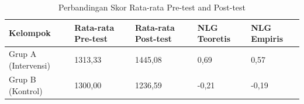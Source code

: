 \begin{table}[!ht]
    \centering
    \caption{Perbandingan Skor Rata-rata Pre-test and Post-test}
    \label{tbl:perbandingan_skor}
    \begin{tabular}{|p{3.5cm}|p{2cm}|p{2cm}|p{2cm}|p{2cm}|}
        \hline
        \textbf{Kelompok} & \textbf{Rata-rata Pre-test} & \textbf{Rata-rata Post-test} & \textbf{NLG Teoretis} & \textbf{NLG Empiris} \\
        \hline
        \hline
        Grup A (Intervensi) & 1313,33 & 1445,08 & 0,69 & 0,57 \\
        \hline
        Grup B (Kontrol) & 1300,00 & 1236,59 & -0,21 & -0,19 \\
        \hline
    \end{tabular}
\end{table}